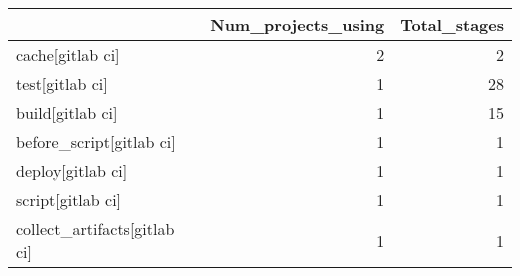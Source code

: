 \begin{tabular}{lrr}
\toprule
{} &  Num\_projects\_using &  Total\_stages \\
\midrule
cache[gitlab ci]             &                   2 &             2 \\
test[gitlab ci]              &                   1 &            28 \\
build[gitlab ci]             &                   1 &            15 \\
before\_script[gitlab ci]     &                   1 &             1 \\
deploy[gitlab ci]            &                   1 &             1 \\
script[gitlab ci]            &                   1 &             1 \\
collect\_artifacts[gitlab ci] &                   1 &             1 \\
\bottomrule
\end{tabular}
